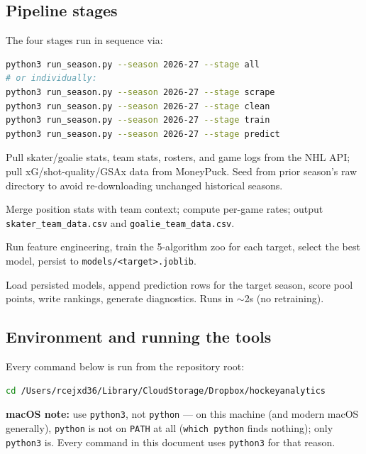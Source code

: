 \documentclass[11pt, a4paper]{article}
\begin{document}
\subsection{Pipeline stages}

The four stages run in sequence via:

\begin{lstlisting}[language=bash]
python3 run_season.py --season 2026-27 --stage all
# or individually:
python3 run_season.py --season 2026-27 --stage scrape
python3 run_season.py --season 2026-27 --stage clean
python3 run_season.py --season 2026-27 --stage train
python3 run_season.py --season 2026-27 --stage predict
\end{lstlisting}

\begin{description}[leftmargin=2cm, style=nextline]
  \item[\texttt{scrape}] Pull skater/goalie stats, team stats, rosters, and game logs from the
        NHL API; pull xG/shot-quality/GSAx data from MoneyPuck. Seed from prior season's raw
        directory to avoid re-downloading unchanged historical seasons.
  \item[\texttt{clean}] Merge position stats with team context; compute per-game rates; output
        \texttt{skater\_team\_data.csv} and \texttt{goalie\_team\_data.csv}.
  \item[\texttt{train}] Run feature engineering, train the 5-algorithm zoo for each target,
        select the best model, persist to \texttt{models/<target>.joblib}.
  \item[\texttt{predict}] Load persisted models, append prediction rows for the target season,
        score pool points, write rankings, generate diagnostics. Runs in $\sim$2s (no retraining).
\end{description}

\subsection{Environment and running the tools}
\label{sec:running}

Every command below is run from the repository root:

\begin{lstlisting}[language=bash]
cd /Users/rcejxd36/Library/CloudStorage/Dropbox/hockeyanalytics
\end{lstlisting}

\textbf{macOS note:} use \texttt{python3}, not \texttt{python} — on this machine (and modern
macOS generally), \texttt{python} is not on \texttt{PATH} at all (\texttt{which python} finds
nothing); only \texttt{python3} is. Every command in this document uses \texttt{python3} for
that reason.
\end{document}
